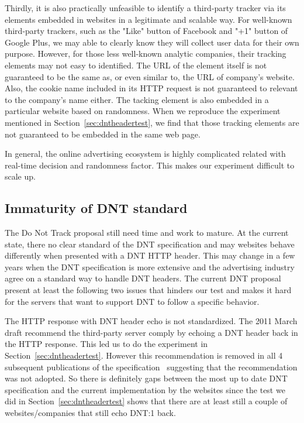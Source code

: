 \documentclass{sig-alternate}
\begin{document}
Thirdly, it is also practically unfeasible to identify a third-party tracker via its elements embedded in websites in a legitimate and scalable way. For well-known third-party trackers, such as the "Like" button of Facebook and "+1" button of Google Plus, we may able to clearly know they will collect user data for their own purpose. However, for those less well-known analytic companies, their tracking elements may not easy to identified. The URL of the element itself is not guaranteed to be the same as, or even similar to, the URL of company's website. Also, the cookie name included in its HTTP request is not guaranteed to relevant to the company's name either. The tacking element is also embedded in a particular website based on randomness. When we reproduce the experiment mentioned in Section~\ref{sec:dntheadertest}, we find that those tracking elements are not guaranteed to be embedded in the same web page.

In general, the online advertising ecosystem is highly complicated related with real-time decision and randomness factor. This makes our experiment difficult to scale up.

\subsection{Immaturity of DNT standard}

The Do Not Track proposal still need time and work to mature. At the current state, there no clear standard of the DNT specification and may websites behave differently when presented with a DNT HTTP header. This may change in a few years when the DNT specification is more extensive and the advertising industry agree on a standard way to handle DNT headers. The current DNT proposal present at least the following two issues that hinders our test and makes it hard for the servers that want to support DNT to follow a specific behavior.

The HTTP response with DNT header echo is not standardized. The 2011 March draft recommend the third-party server comply by echoing a DNT header back in the HTTP response. This led us to do the experiment in Section~\ref{sec:dntheadertest}. However this recommendation is removed in all 4 subsequent publications of the specification~\cite{tracking_dnt20130430, tracking_dnt20121002, tracking_dnt20120313, tracking_dnt20111114} suggesting that the recommendation was not adopted. So there is definitely gaps between the most up to date DNT specification and the current implementation by the websites since the test we did in Section~\ref{sec:dntheadertest} shows that there are at least still a couple of websites/companies that still echo DNT:1 back.
\end{document}

